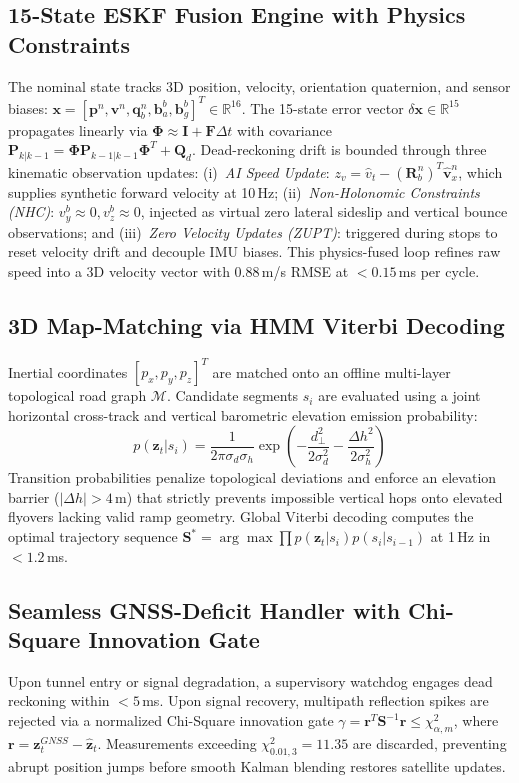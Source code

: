 \documentclass[conference]{IEEEtran}
\begin{document}
\subsection{15-State ESKF Fusion Engine with Physics Constraints}
The nominal state tracks 3D position, velocity, orientation quaternion, and sensor biases: $\mathbf{x} = [\mathbf{p}^n, \mathbf{v}^n, \mathbf{q}_b^n, \mathbf{b}_a^b, \mathbf{b}_g^b]^T \in \mathbb{R}^{16}$. The 15-state error vector $\delta\mathbf{x} \in \mathbb{R}^{15}$ propagates linearly via $\boldsymbol{\Phi} \approx \mathbf{I} + \mathbf{F}\Delta t$ with covariance $\mathbf{P}_{k|k-1} = \boldsymbol{\Phi}\mathbf{P}_{k-1|k-1}\boldsymbol{\Phi}^T + \mathbf{Q}_d$. Dead-reckoning drift is bounded through three kinematic observation updates:
(i)~\textit{AI Speed Update}: $z_v = \hat{v}_t - (\mathbf{R}_b^n)^T \hat{\mathbf{v}}_x^n$, which supplies synthetic forward velocity at 10\,Hz;
(ii)~\textit{Non-Holonomic Constraints (NHC)}: $v_y^b \approx 0, v_z^b \approx 0$, injected as virtual zero lateral sideslip and vertical bounce observations; and
(iii)~\textit{Zero Velocity Updates (ZUPT)}: triggered during stops to reset velocity drift and decouple IMU biases. This physics-fused loop refines raw speed into a 3D velocity vector with 0.88\,m/s RMSE at $<0.15$\,ms per cycle.

\subsection{3D Map-Matching via HMM Viterbi Decoding}
Inertial coordinates $[p_x, p_y, p_z]^T$ are matched onto an offline multi-layer topological road graph $\mathcal{M}$. Candidate segments $s_i$ are evaluated using a joint horizontal cross-track and vertical barometric elevation emission probability:
\begin{equation}
p(\mathbf{z}_t|s_i) = \frac{1}{2\pi\sigma_d\sigma_h}\exp\left(-\frac{d_{\perp}^2}{2\sigma_d^2} - \frac{\Delta h^2}{2\sigma_h^2}\right)
\end{equation}
Transition probabilities penalize topological deviations and enforce an elevation barrier ($|\Delta h| > 4$\,m) that strictly prevents impossible vertical hops onto elevated flyovers lacking valid ramp geometry. Global Viterbi decoding computes the optimal trajectory sequence $\mathbf{S}^* = \arg\max \prod p(\mathbf{z}_t|s_i)p(s_i|s_{i-1})$ at 1\,Hz in $<1.2$\,ms.

\subsection{Seamless GNSS-Deficit Handler with Chi-Square Innovation Gate}
Upon tunnel entry or signal degradation, a supervisory watchdog engages dead reckoning within $<5$\,ms. Upon signal recovery, multipath reflection spikes are rejected via a normalized Chi-Square innovation gate $\gamma = \mathbf{r}^T\mathbf{S}^{-1}\mathbf{r} \leq \chi^2_{\alpha,m}$, where $\mathbf{r} = \mathbf{z}_t^{GNSS} - \hat{\mathbf{z}}_t$. Measurements exceeding $\chi^2_{0.01, 3} = 11.35$ are discarded, preventing abrupt position jumps before smooth Kalman blending restores satellite updates.
\end{document}
